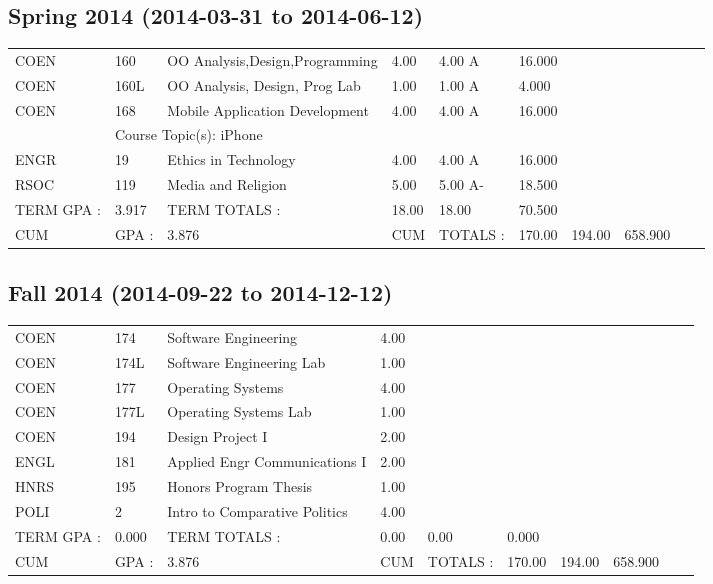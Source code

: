 \documentclass{scrartcl}\usepackage[T1]{fontenc}
\begin{document}
\subsection{Spring 2014	(2014-03-31 to 2014-06-12)}
\begin{tabular}{ l  l  l  l  l  l  l  l  l  l }
COEN&160&OO Analysis,Design,Programming&4.00&4.00 A&16.000& & & & \\
COEN&160L&OO Analysis, Design, Prog Lab&1.00&1.00 A&4.000& & & & \\
COEN&168&Mobile Application Development&4.00&4.00 A&16.000& & & & \\
\multicolumn{1}{l}{ }
&
\multicolumn{9}{l}{Course Topic(s): iPhone}
\\
ENGR&19&Ethics in Technology&4.00&4.00 A&16.000& & & & \\
RSOC&119&Media and Religion&5.00&5.00 A-&18.500& & & & \\
\hline
TERM GPA :&3.917&TERM TOTALS :&18.00&18.00&70.500& & & & \\
CUM&GPA :&3.876&CUM&TOTALS :&170.00&194.00&658.900& & \\\end{tabular}
\subsection{Fall 2014	(2014-09-22 to 2014-12-12)}
\begin{tabular}{ l  l  l  l  l  l  l  l  l  l }
COEN&174&Software Engineering&4.00& & & & & & \\
COEN&174L&Software Engineering Lab&1.00& & & & & & \\
COEN&177&Operating Systems&4.00& & & & & & \\
COEN&177L&Operating Systems Lab&1.00& & & & & & \\
COEN&194&Design Project I&2.00& & & & & & \\
ENGL&181&Applied Engr Communications I&2.00& & & & & & \\
HNRS&195&Honors Program Thesis&1.00& & & & & & \\
POLI&2&Intro to Comparative Politics&4.00& & & & & & \\
\hline
TERM GPA :&0.000&TERM TOTALS :&0.00&0.00&0.000& & & & \\
CUM&GPA :&3.876&CUM&TOTALS :&170.00&194.00&658.900& & \\\end{tabular}
\end{document}
